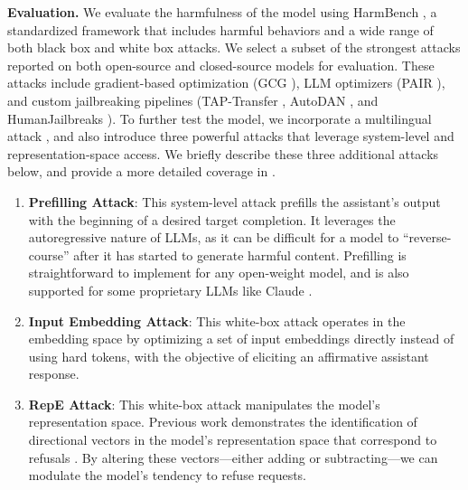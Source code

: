 \textbf{Evaluation.} \quad
We evaluate the harmfulness of the model using HarmBench \citep{mazeika2024harmbench}, a standardized framework that includes harmful behaviors and a wide range of both black box and white box attacks. We select a subset of the strongest attacks reported on both open-source and closed-source models for evaluation. These attacks include gradient-based optimization (GCG \citep{zou2023universal}), LLM optimizers (PAIR \citep{chao2023jailbreaking}), and custom jailbreaking pipelines (TAP-Transfer \citep{zeng2024johnny}, AutoDAN \citep{liu2023autodan}, and HumanJailbreaks \citep{shen2024dohumanjailbreaks}). To further test the model, we incorporate a multilingual attack \citep{yong2023low}, and also introduce three powerful attacks that leverage system-level and representation-space access. We briefly describe these three additional attacks below, and provide a more detailed coverage in .

\begin{enumerate}[leftmargin=1cm]
    \item \textbf{Prefilling Attack}: This system-level attack prefills the assistant's output with the beginning of a desired target completion. It leverages the autoregressive nature of LLMs, as it can be difficult for a model to ``reverse-course'' after it has started to generate harmful content. Prefilling is straightforward to implement for any open-weight model, and is also supported for some proprietary LLMs like Claude \citep{anthropic2024prefillclaude}.
    \item \textbf{Input Embedding Attack}: This white-box attack operates in the embedding space by optimizing a set of input embeddings directly instead of using hard tokens, with the objective of eliciting an affirmative assistant response.
    \item \textbf{RepE Attack}: This white-box attack manipulates the model's representation space. Previous work demonstrates the identification of directional vectors in the model's representation space that correspond to refusals \citep{zou2023representation}. By altering these vectors---either adding or subtracting---we can modulate the model's tendency to refuse requests. %
\end{enumerate}

